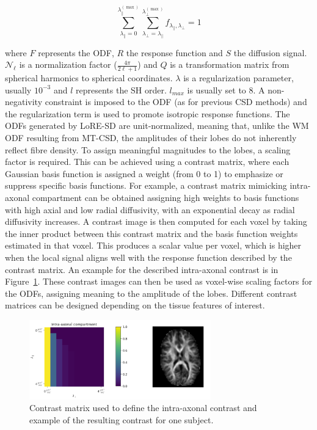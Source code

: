 \begin{equation}
\sum_{\lambda_\parallel = 0}^{\lambda_\parallel^{(\max)}} \sum_{\lambda_\perp = \lambda_\parallel}^{\lambda_\perp^{(\max)}} f_{\lambda_\parallel, \lambda_\perp} = 1
\end{equation}

where $F$ represents the ODF, $R$ the response function and $S$ the diffusion signal. $\mathcal{N}_\ell$ is a normalization factor ($\frac{4\pi}{2\ell + 1}$) and $Q$ is a transformation matrix from spherical harmonics to spherical coordinates. $\lambda$ is a regularization parameter, usually $10^{-3}$ and $l$ represents the SH order. $l_{max}$ is usually set to  8.
A non-negativity constraint is imposed to the ODF (as for previous CSD methods) and the regularization term is used to promote isotropic response functions.
The ODFs generated by LoRE-SD are unit-normalized, meaning that, unlike the WM ODF resulting from MT-CSD, the amplitudes of their lobes do not inherently reflect fibre density. To assign meaningful magnitudes to the lobes, a scaling factor is required. This can be achieved using a contrast matrix, where each Gaussian basis function is assigned a weight (from 0 to 1) to emphasize or suppress specific basis functions. For example, a contrast matrix mimicking intra-axonal compartment can be obtained assigning high weights to basis functions with high axial and low radial diffusivity, with an exponential decay as radial diffusivity increases.
A contrast image is then computed for each voxel by taking the inner product between this contrast matrix and the basis function weights estimated in that voxel. This produces a scalar value per voxel, which is higher when the local signal aligns well with the response function described by the contrast matrix. An example for the described intra-axonal contrast is in Figure~\ref{fig:contrast}. These contrast images can then be used as voxel-wise scaling factors for the ODFs, assigning meaning to the amplitude of the lobes. Different contrast matrices can be designed depending on the tissue features of interest. 

\begin{figure}[h]
  \centering
  \includegraphics[width=0.7\textwidth]{Images/contrast.png} %
  \caption{Contrast matrix used to define the intra-axonal contrast and example of the resulting contrast for one subject.}
  \label{fig:contrast}
\end{figure}

